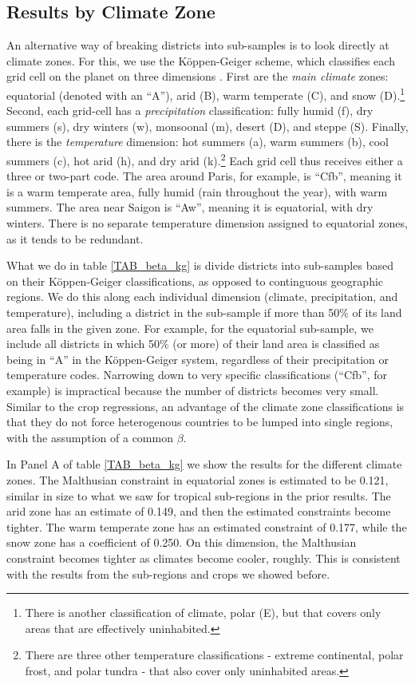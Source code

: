 \documentclass[11pt]{article}
\begin{document}
\subsection{Results by Climate Zone}
An alternative way of breaking districts into sub-samples is to look directly at climate zones. For this, we use the K{\"o}ppen-Geiger scheme, which classifies each grid cell on the planet on three dimensions \citep{kottek2006}. First are the \textit{main climate} zones: equatorial (denoted with an ``A''), arid (B), warm temperate (C), and snow (D).\footnote{There is another classification of climate, polar (E), but that covers only areas that are effectively uninhabited.} Second, each grid-cell has a \textit{precipitation} classification: fully humid (f), dry summers (s), dry winters (w), monsoonal (m), desert (D), and steppe (S). Finally, there is the \textit{temperature} dimension: hot summers (a), warm summers (b), cool summers (c), hot arid (h), and dry arid (k).\footnote{There are three other temperature classifications - extreme continental, polar frost, and polar tundra - that also cover only uninhabited areas.} Each grid cell thus receives either a three or two-part code. The area around Paris, for example, is ``Cfb'', meaning it is a warm temperate area, fully humid (rain throughout the year), with warm summers. The area near Saigon is ``Aw'', meaning it is equatorial, with dry winters. There is no separate temperature dimension assigned to equatorial zones, as it tends to be redundant.

What we do in table \ref{TAB_beta_kg} is divide districts into sub-samples based on their K{\"o}ppen-Geiger classifications, as opposed to continguous geographic regions. We do this along each individual dimension (climate, precipitation, and temperature), including a district in the sub-sample if more than 50\% of its land area falls in the given zone. For example, for the equatorial sub-sample, we include all districts in which 50\% (or more) of their land area is classified as being in ``A'' in the K{\"o}ppen-Geiger system, regardless of their precipitation or temperature codes. Narrowing down to very specific classifications (``Cfb'', for example) is impractical because the number of districts becomes very small. Similar to the crop regressions, an advantage of the climate zone classifications is that they do not force heterogenous countries to be lumped into single regions, with the assumption of a common $\beta$. 

In Panel A of table \ref{TAB_beta_kg} we show the results for the different climate zones. The Malthusian constraint in equatorial zones is estimated to be 0.121, similar in size to what we saw for tropical sub-regions in the prior results. The arid zone has an estimate of 0.149, and then the estimated constraints become tighter. The warm temperate zone has an estimated constraint of 0.177, while the snow zone has a coefficient of 0.250. On this dimension, the Malthusian constraint becomes tighter as climates become cooler, roughly. This is consistent with the results from the sub-regions and crops we showed before. 
\end{document}
